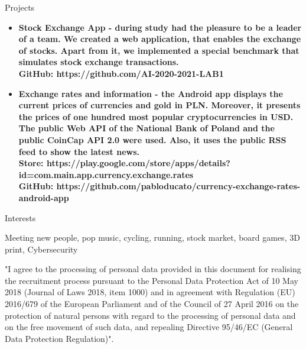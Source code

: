 \documentclass{resume}
\begin{document}
\begin{rSection}{Projects}

    \begin{itemize}
        \item \bf Stock Exchange App \normalfont - during study had the pleasure to be a leader of a team.
        We created a web application, that enables the exchange of stocks. Apart from it, we implemented a special benchmark that simulates stock exchange transactions.\\
        GitHub: https://github.com/AI-2020-2021-LAB1
        \item \bf Exchange rates and information \normalfont - the Android app displays the current prices of currencies and gold in PLN.
        Moreover, it presents the prices of one hundred most popular cryptocurrencies in USD.
        The public Web API of the National Bank of Poland and the public CoinCap API 2.0 were used.
        Also, it uses the public RSS feed to show the latest news.\\
        Store: https://play.google.com/store/apps/details?id=com.main.app.currency.exchange.rates \\
        GitHub: https://github.com/pabloducato/currency-exchange-rates-android-app
    \end{itemize}
    
\end{rSection}

\begin{rSection}{Interests}

{Meeting new people, pop music, cycling, running, stock market, board games, 3D print, Cybersecurity}

\end{rSection}

{\footnotesize "I agree to the processing of personal data provided in this document for realising the recruitment process pursuant to the Personal Data
Protection Act of 10 May 2018 (Journal of Laws 2018, item 1000) and in agreement with Regulation (EU) 2016/679 of the European Parliament and of
the Council of 27 April 2016 on the protection of natural persons with regard to the processing of personal data and on the free movement of such
data, and repealing Directive 95/46/EC (General Data Protection Regulation)".}
\end{document}
